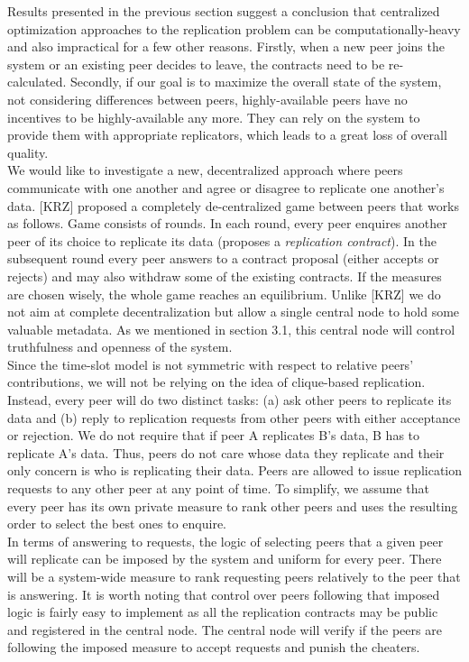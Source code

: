 \documentclass{pracamgren}
\begin{document}
Results presented in the previous section suggest a conclusion that centralized optimization approaches to the replication problem can be computationally-heavy and also impractical for a few other reasons. Firstly, when a new peer joins the system or an existing peer decides to leave, the contracts need to be re-calculated. Secondly, if our goal is to maximize the overall state of the system, not considering differences between peers, highly-available peers have no incentives to be highly-available any more. They can rely on the system to provide them with appropriate replicators, which leads to a great loss of overall quality.\\

We would like to investigate a new, decentralized approach where peers communicate with one another and agree or disagree to replicate one another's data. [KRZ] proposed a completely de-centralized game between peers that works as follows. Game consists of rounds. In each round, every peer enquires another peer of its choice to replicate its data (proposes a {\it replication contract}). In the subsequent round every peer answers to a contract proposal (either accepts or rejects) and may also withdraw some of the existing contracts. If the measures are chosen wisely, the whole game reaches an equilibrium. Unlike [KRZ] we do not aim at complete decentralization but allow a single central node to hold some valuable metadata. As we mentioned in section 3.1, this central node will control truthfulness and openness of the system.\\

Since the time-slot model is not symmetric with respect to relative peers' contributions, we will not be relying on the idea of clique-based replication. Instead, every peer will do two distinct tasks: (a) ask other peers to replicate its data and (b) reply to replication requests from other peers with either acceptance or rejection. We do not require that if peer A replicates B's data, B has to replicate A's data. Thus, peers do not care whose data they replicate and their only concern is who is replicating their data. Peers are allowed to issue replication requests to any other peer at any point of time. To simplify, we assume that every peer has its own private measure to rank other peers and uses the resulting order to select the best ones to enquire.\\

In terms of answering to requests, the logic of selecting peers that a given peer will replicate can be imposed by the system and uniform for every peer. There will be a system-wide measure to rank requesting peers relatively to the peer that is answering. It is worth noting that control over peers following that imposed logic is fairly easy to implement as all the replication contracts may be public and registered in the central node. The central node will verify if the peers are following the imposed measure to accept requests and punish the cheaters.\\
\end{document}
